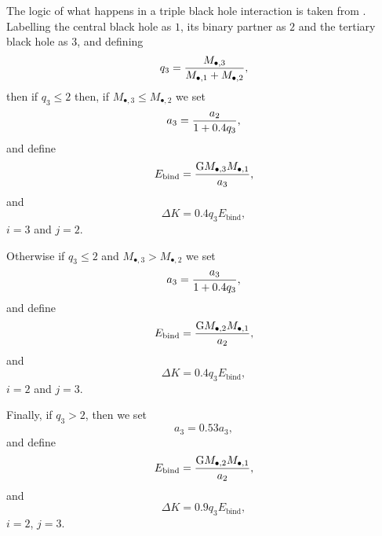 The logic of what happens in a triple black hole interaction is taken from \cite{volonteri_assembly_2003}. Labelling the central black hole as $1$, its binary partner as $2$ and the tertiary black hole as $3$, and defining
\begin{equation}
q_3 = {M_{\bullet, 3} \over M_{\bullet, 1} + M_\mathrm{\bullet, 2} },
\end{equation}
then if $q_3 \le 2$ then, if $M_{\bullet, 3} \le M_\mathrm{\bullet, 2}$ we set
\begin{equation}
a_3 = {a_2 \over 1 + 0.4 q_3}, 
\end{equation}
and define
\begin{equation}
E_\mathrm{bind} = {\mathrm{G} M_{\bullet, 3} M_{\bullet, 1} \over a_3},
\end{equation}
and
\begin{equation}
\Delta K =0.4 q_3 E_\mathrm{bind},
\end{equation}
$i=3$ and $j=2$. 

Otherwise if $q_3 \le 2$ and $M_{\bullet, 3} > M_\mathrm{\bullet, 2}$ we set
\begin{equation}
a_3 = { a_3 \over 1 +0.4 q_3},
\end{equation}
and define
\begin{equation}
E_\mathrm{bind} = {\mathrm{G} M_{\bullet, 2} M_{\bullet, 1} \over a_2},
\end{equation}
and
\begin{equation}
 \Delta K =0.4 q_3 E_\mathrm{bind},
\end{equation}
$i=2$ and $j=3$.

Finally, if $q_3 > 2$, then we set
\begin{equation}
a_3 =0.53 a_3,
\end{equation}
and define
\begin{equation}
E_\mathrm{bind} = {\mathrm{G} M_{\bullet, 2} M_{\bullet, 1} \over a_2},
\end{equation}
and
\begin{equation}
\Delta K =0.9 q_3 E_\mathrm{bind},
\end{equation}
$i=2$, $j=3$.


